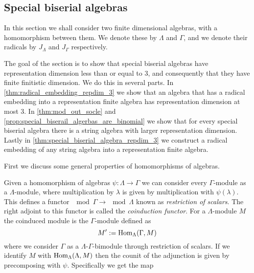 \subsection{Special biserial algebras}\label{sec:special_biserial_algebras}

In this section we shall consider two finite dimensional algebras, with a homomorphism between them. We denote these by $\Lambda$ and $\Gamma$, and we denote their radicals by $J_\Lambda$ and $J_\Gamma$ respectively.

The goal of the section is to show that special biserial algebras have representation dimension less than or equal to 3, and consequently that they have finite finitistic dimension. We do this in several parts. In \cref{thm:radical_embedding_repdim_3} we show that an algebra that has a radical embedding into a representation finite algebra has representation dimension at most 3. In \cref{thm:mod_out_socle} and \cref{prop:special_biserail_algerbas_are_binomial} we show that for every special biserial algebra there is a string algebra with larger representation dimension. Lastly in \cref{thm:special_biserial_algebra_repdim_3} we construct a radical embedding of any string algebra into a representation finite algebra.

First we discuss some general properties of homomorphisms of algebras.

\begin{defn}
	Given a homomorphism of algebras $\psi\colon\Lambda \to \Gamma$ we can consider every $\Gamma$-module as a $\Lambda$-module, where multiplication by $\lambda$ is given by multiplication with $\psi(\lambda)$. This defines a functor $\mod\Gamma \to \mod\Lambda$ known as \emph{restriction of scalars}. The right adjoint to this functor is called the \emph{coinduction functor}. For a $\Lambda$-module $M$ the coinduced module is the $\Gamma$-module defined as
	$$M' := \operatorname{Hom}_\Lambda(\Gamma, M)$$
	where we consider $\Gamma$ as a $\Lambda$-$\Gamma$-bimodule through restriction of scalars. If we identify $M$ with $\operatorname{Hom}_\Lambda(\Lambda, M)$ then the counit of the adjunction is given by precomposing with $\psi$. Specifically we get the map
	\begin{center}
	\end{center}
\end{defn}

